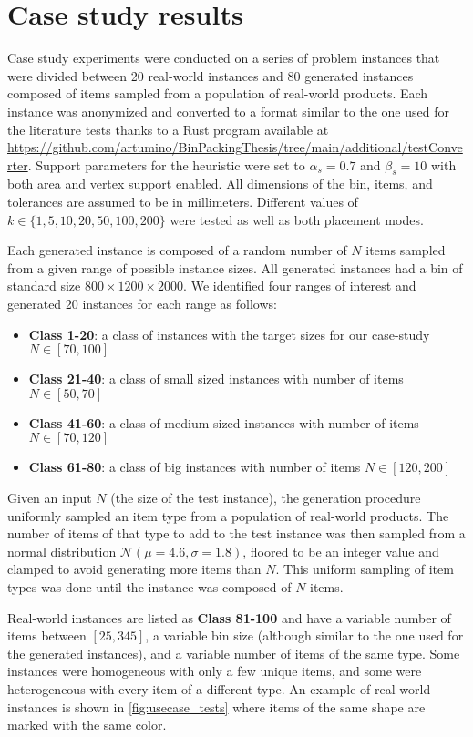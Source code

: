 \section{Case study results}
Case study experiments were conducted on a series of problem instances that were divided between 20 real-world instances and 80 generated instances composed of items sampled from a population of real-world products.
Each instance was anonymized and converted to a format similar to the one used for the literature tests thanks to a Rust program available at \url{https://github.com/artumino/BinPackingThesis/tree/main/additional/testConverter}.
Support parameters for the heuristic were set to $\alpha_s = 0.7$ and $\beta_s = 10$ with both area and vertex support enabled. All dimensions of the bin, items, and tolerances are assumed to be in millimeters.
Different values of $k \in \{1, 5, 10, 20, 50, 100, 200\}$ were tested as well as both placement modes.

Each generated instance is composed of a random number of $N$ items sampled from a given range of possible instance sizes. All generated instances had a bin of standard size $800 \times 1200 \times 2000$.
We identified four ranges of interest and generated 20 instances for each range as follows:
\begin{itemize}
    \item \textbf{Class 1-20}: a class of instances with the target sizes for our case-study $N \in [70,100]$
    \item \textbf{Class 21-40}: a class of small sized instances with number of items $N \in [50,70]$
    \item \textbf{Class 41-60}: a class of medium sized instances with number of items $N \in [70,120]$
    \item \textbf{Class 61-80}: a class of big instances with number of items $N \in [120,200]$
\end{itemize}

Given an input $N$ (the size of the test instance), the generation procedure uniformly sampled an item type from a population of real-world products. The number of items of that type to add to the test instance was then sampled from a normal distribution $\mathcal{N}(\mu = 4.6, \sigma = 1.8)$, floored to be an integer value and clamped to avoid generating more items than $N$. 
This uniform sampling of item types was done until the instance was composed of $N$ items.

Real-world instances are listed as \textbf{Class 81-100} and have a variable number of items between $[25, 345]$, a variable bin size (although similar to the one used for the generated instances), and a variable number of items of the same type. Some instances were homogeneous with only a few unique items, and some were heterogeneous with every item of a different type.
An example of real-world instances is shown in \cref{fig:usecase_tests} where items of the same shape are marked with the same color.

